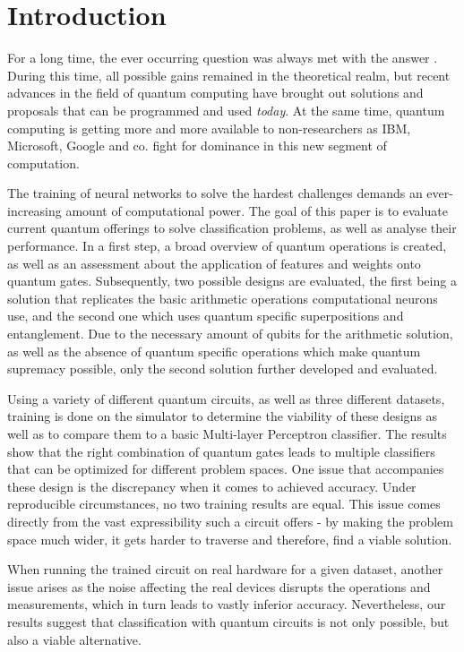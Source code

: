 
\chapter{Introduction} %

\label{chapter:introduction}

For a long time, the ever occurring question  was always met with the answer . During this time, all possible gains remained in the theoretical realm\cite{shor_polynomial-time_1997}, but recent advances in the field of quantum computing have brought out solutions and proposals\cite{farhi_quantum_2014, fankhauser_multiple_2021, havlicek_supervised_2019} that can be programmed and used \emph{today}. At the same time, quantum computing is getting more and more available to non-researchers as IBM, Microsoft, Google and co. fight for dominance in this new segment of computation.\par
The training of neural networks to solve the hardest challenges demands an ever-increasing amount of computational power\cite{openai_ai_2018}. The goal of this paper is to evaluate current quantum offerings to solve classification problems, as well as analyse their performance. In a first step, a broad overview of quantum operations is created, as well as an assessment about the application of features and weights onto quantum gates. Subsequently, two possible designs are evaluated, the first being a solution that replicates the basic arithmetic operations computational neurons use, and the second one which uses quantum specific superpositions and entanglement. Due to the necessary amount of qubits for the arithmetic solution, as well as the absence of quantum specific operations which make quantum supremacy possible, only the second solution further developed and evaluated.\par 
Using a variety of different quantum circuits, as well as three different datasets, training is done on the simulator to determine the viability of these designs as well as to compare them to a basic Multi-layer Perceptron classifier. The results show that the right combination of quantum gates leads to multiple classifiers that can be optimized for different problem spaces. One issue that accompanies these design is the discrepancy when it comes to achieved accuracy. Under reproducible circumstances, no two training results are equal. This issue comes directly from the vast expressibility such a circuit offers - by making the problem space much wider, it gets harder to traverse and therefore, find a viable solution.\par 
When running the trained circuit on real hardware for a given dataset, another issue arises as the noise affecting the real devices disrupts the operations and measurements, which in turn leads to vastly inferior accuracy. Nevertheless, our results suggest that classification with quantum circuits is not only possible, but also a viable alternative.